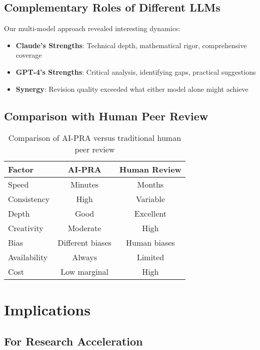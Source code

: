 \documentclass[11pt,a4paper]{article}
\begin{document}
\subsection{Complementary Roles of Different LLMs}

Our multi-model approach revealed interesting dynamics:

\begin{itemize}
    \item \textbf{Claude's Strengths}: Technical depth, mathematical rigor, comprehensive coverage
    \item \textbf{GPT-4's Strengths}: Critical analysis, identifying gaps, practical suggestions
    \item \textbf{Synergy}: Revision quality exceeded what either model alone might achieve
\end{itemize}

\subsection{Comparison with Human Peer Review}

\begin{table}[h]
\centering
\begin{tabular}{lcc}
\toprule
\textbf{Factor} & \textbf{AI-PRA} & \textbf{Human Review} \\
\midrule
Speed & Minutes & Months \\
Consistency & High & Variable \\
Depth & Good & Excellent \\
Creativity & Moderate & High \\
Bias & Different biases & Human biases \\
Availability & Always & Limited \\
Cost & Low marginal & High \\
\bottomrule
\end{tabular}
\caption{Comparison of AI-PRA versus traditional human peer review}
\end{table}

\section{Implications}

\subsection{For Research Acceleration}
\end{document}
